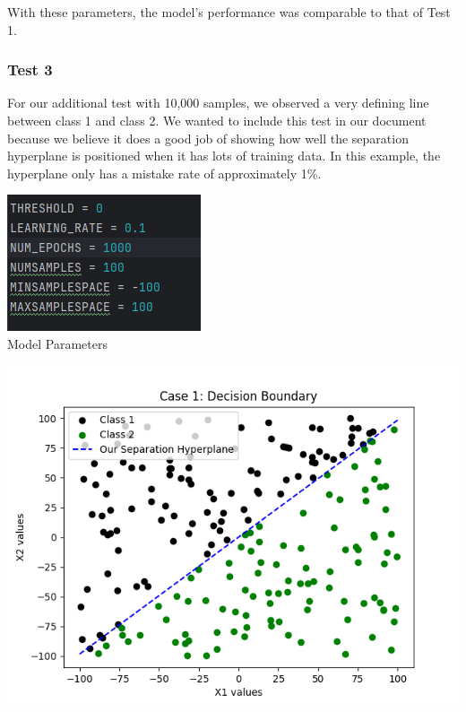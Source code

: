 \documentclass{article}
\begin{document}
With these parameters, the model's performance was comparable to that of Test 1.

\subsubsection{Test 3}

For our additional test with 10,000 samples, we observed a very defining line between class 1 and class 2. We wanted to include this test in our document because we believe it does a good job of showing how well the separation hyperplane is positioned when it has lots of training data. In this example, the hyperplane only has a mistake rate of approximately 1\%.

\begin{center}
\includegraphics[scale=0.75]{../figs/T3.1.png} \\
\caption{Model Parameters}
\end{center}

\begin{center}
\includegraphics[scale=0.75]{../figs/T3.2.png} \\
\end{center}
\end{document}
